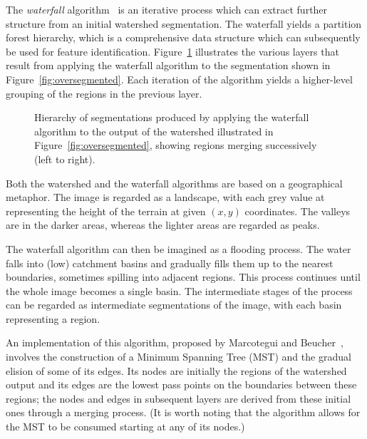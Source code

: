 \documentclass{jfp}
\begin{document}
The {\em waterfall\/} algorithm~\cite{beucher94,marcotegui} is an
iterative process which can extract further structure from an initial
watershed segmentation. The waterfall yields a partition forest
hierarchy, which is a comprehensive data structure which can
subsequently be used for feature identification.
Figure~\ref{fig:waterfall} illustrates the various layers that result
from applying the waterfall algorithm to the segmentation shown in
Figure~\ref{fig:oversegmented}.  Each iteration of the algorithm
yields a higher-level grouping of the regions in the previous layer.
\begin{figure}
\centering
\ifpdf
        \hspace{1mm}%
        \hspace{1mm}%
\else
\fi
\caption{Hierarchy of segmentations produced by applying the waterfall
  algorithm to the output of the watershed illustrated in
  Figure~\ref{fig:oversegmented}, showing regions merging successively
  (left to right).}
\label{fig:waterfall}
\end{figure}

Both the watershed and the waterfall algorithms are based on a
geographical metaphor. The image is regarded as a landscape, with each
grey value at representing the height of the terrain at given $(x,y)$
coordinates.
%
The valleys are
in the darker areas, whereas the lighter areas are regarded as peaks.

The waterfall algorithm can then be imagined
as a flooding process. The water falls into (low) catchment basins and
gradually fills them up to the nearest boundaries, sometimes spilling
into adjacent regions. This process continues until the whole image
becomes a single basin. The intermediate stages of the process can be
regarded as intermediate segmentations of the image, with each basin
representing a region.

An implementation of this algorithm, proposed by Marcotegui and
Beucher~\cite{marcotegui}, involves the construction of a Minimum
Spanning Tree (MST) and the gradual elision of some of its edges.  Its
nodes are initially the regions of the watershed output and its edges
are the lowest pass points on the boundaries between these regions;
the nodes and edges in subsequent layers are derived from these
initial ones through a merging process. (It is worth noting that the
algorithm allows for the MST to be consumed starting at any of its
nodes.)
\end{document}
